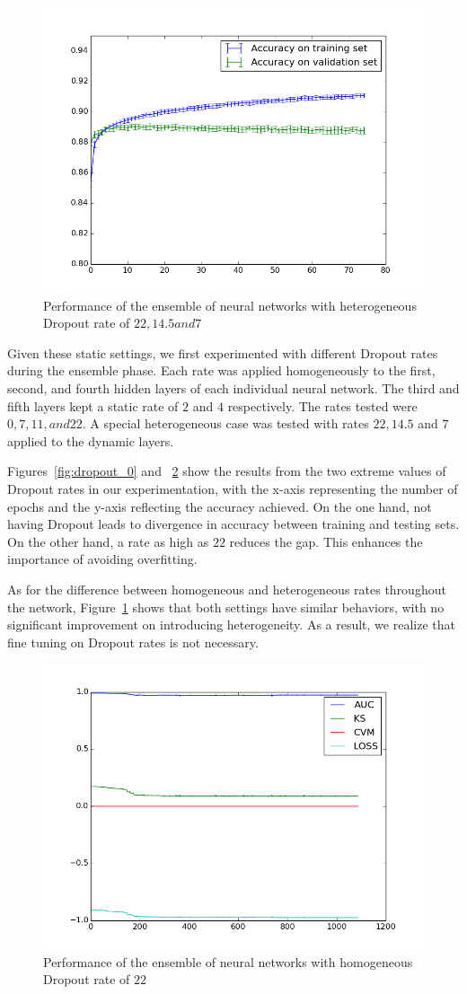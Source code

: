 \documentclass[conference]{IEEEtran}
\begin{document}
\begin{figure}[!ht]
	\centering
	\includegraphics[width=.5\textwidth]{../imgs/ensemble_stats_d22_7.png}
	\caption{Performance of the ensemble of neural networks with heterogeneous Dropout rate of $22, 14.5 and 7$ }
	\label{fig:dropout_22_7}
\end{figure}

Given these static settings, we first experimented with different Dropout rates during the ensemble phase. Each rate was applied homogeneously to the first, second, and fourth hidden layers of each individual neural network. The third and fifth layers kept a static rate of $2$ and $4$ respectively. The rates tested were $0, 7, 11, and 22$. A special heterogeneous case was tested with rates $22, 14.5$ and $7$ applied to the dynamic layers.

Figures~\ref{fig:dropout_0} and ~\ref{fig:dropout_22} show the results from the two extreme values of Dropout rates in our experimentation, with the x-axis representing the number of epochs and the y-axis reflecting the accuracy achieved. On the one hand, not having Dropout leads to divergence in accuracy between training and testing sets. On the other hand, a rate as high as $22$ reduces the gap. This enhances the importance of avoiding overfitting. 

As for the difference between homogeneous and heterogeneous rates throughout the network, Figure~\ref{fig:dropout_22_7} shows that both settings have similar behaviors, with no significant improvement on introducing heterogeneity. As a result, we realize that fine tuning on Dropout rates is not necessary.

\begin{figure}[!ht]
	\centering
	\includegraphics[width=.5\textwidth]{../imgs/transductor_stats_pt1.png}
	\caption{Performance of the ensemble of neural networks with homogeneous Dropout rate of $22$}
	\label{fig:dropout_22}
\end{figure}
\end{document}
